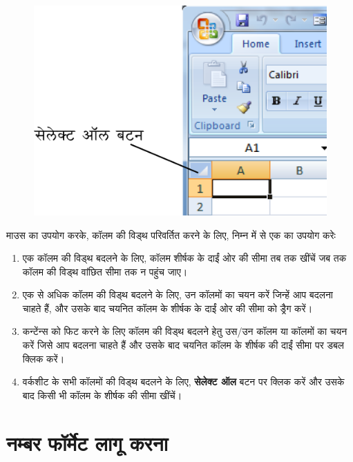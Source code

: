 \begin{figure}[H]
\centering
\includegraphics[scale=.75]{src/images/chapter2/chapter2_fig14.png}
\end{figure}
माउस का उपयोग करके, कॉलम की विड्थ परिवर्तित करने के लिए, निम्न में से एक का उपयोग करेः
\begin{enumerate}
\renewcommand{\labelenumi}{\theenumi)}
\item एक कॉलम की विड्थ बदलने के लिए, कॉलम शीर्षक के दाईं ओर की सीमा तब तक खींचें जब तक कॉलम की विड्थ वांछित सीमा तक न पहुंच जाए।
\item एक से अधिक कॉलम की विड्थ बदलने के लिए, उन कॉलमों का चयन करें जिन्हें आप बदलना चाहते हैं, और उसके बाद चयनित कॉलम के शीर्षक के दाईं ओर की सीमा को ड्रैग करें।
\item कन्टेंन्स को फिट करने के लिए कॉलम की विड्थ बदलने हेतु उस/उन कॉलम या कॉलमों का चयन करें जिसे आप बदलना चाहते हैं और उसके बाद चयनित कॉलम के शीर्षक की दाईं सीमा पर डबल क्लिक करें।
\item वर्कशीट के सभी कॉलमों की विड्थ बदलने के लिए, \textbf{सेलेक्ट ऑल} बटन पर क्लिक करें और उसके बाद किसी भी कॉलम के शीर्षक की सीमा खींचें।
\end{enumerate}

\section{नम्बर फॉर्मेट लागू करना}\label{id-2.7}

